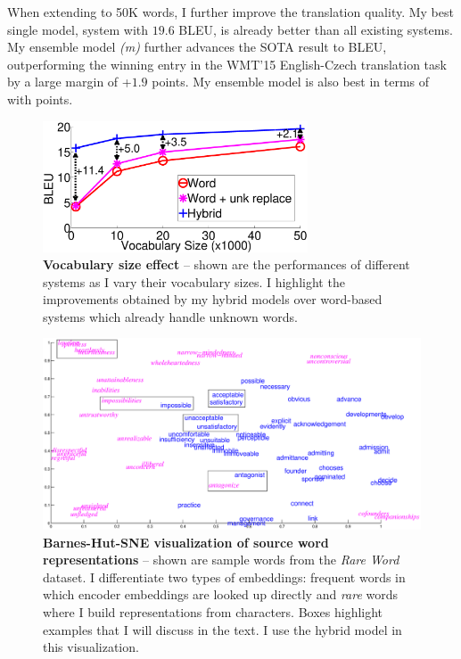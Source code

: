 When extending to 50K words, I further improve the translation quality.
My best single model, system \model{} with $19.6$ BLEU, is already better than all
existing systems.
My ensemble model {\it (m)} further advances the SOTA
result to \biformat{\ensbleu} BLEU, outperforming
the winning entry in the WMT'15 English-Czech translation task by a large margin
of +$1.9$ points. My ensemble model is also best in terms of \chr{} with  points.

\begin{figure}%
\centering
\includegraphics[width=0.7\textwidth, clip=true, trim= 0 0 0 0]{img/5-vocab}
\caption[Vocabulary size effect]{{\bf Vocabulary size effect} -- shown are the performances of different
systems as I vary their vocabulary sizes. I highlight the improvements obtained
by my hybrid models over word-based systems which already handle unknown words.}
\label{f:vocab}
\end{figure}


\begin{figure}%
\centering
\includegraphics[width=\textwidth, clip=true, trim= 100 50 0 20]{img/5-emb}
\caption[Barnes-Hut-SNE visualization of source word representations]{{\bf Barnes-Hut-SNE visualization of source word representations} --
shown are sample words from the {\it Rare Word} dataset. I differentiate two types of
embeddings: {\color{blue} frequent} words in which encoder embeddings are looked up directly and {\it {\color{magenta} rare}} words
where I build representations from characters. Boxes highlight examples that
I will discuss in the text. I use the hybrid model \model{} in this visualization.}
\label{f:visual}
\end{figure}


